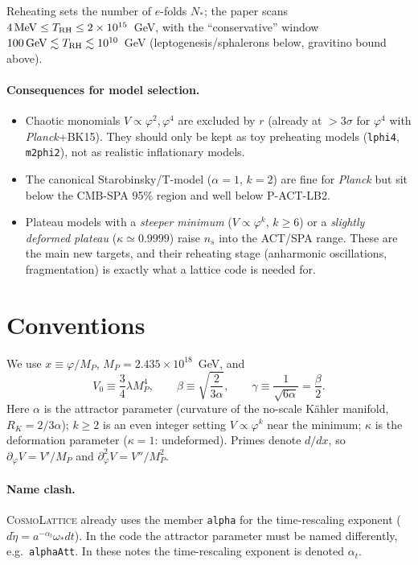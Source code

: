 \documentclass[11pt,a4paper]{article}
\newcommand{\MP}{M_P}
\newcommand{\trh}{T_{\rm RH}}
\newcommand{\aatt}{\alpha}
\newcommand{\at}{\alpha_t}
\begin{document}
Reheating sets the number of $e$-folds $N_*$; the paper scans $4\,{\rm MeV}\le \trh \le 2\times 10^{15}$~GeV, with the ``conservative'' window $100\,{\rm GeV}\lesssim \trh \lesssim 10^{10}$~GeV (leptogenesis/sphalerons below, gravitino bound above).

\paragraph{Consequences for model selection.}
\begin{itemize}
\item Chaotic monomials $V\propto\varphi^2,\varphi^4$ are excluded by $r$ (already at $>3\sigma$ for $\varphi^4$ with \textit{Planck}+BK15). They should only be kept as toy preheating models (\texttt{lphi4}, \texttt{m2phi2}), not as realistic inflationary models.
\item The canonical Starobinsky/T-model ($\aatt=1$, $k=2$) are fine for \textit{Planck} but sit below the CMB-SPA 95\% region and well below P-ACT-LB2.
\item Plateau models with a \emph{steeper minimum} ($V\propto\varphi^k$, $k\ge 6$) or a \emph{slightly deformed plateau} ($\kappa\simeq 0.9999$) raise $n_s$ into the ACT/SPA range. These are the main new targets, and their reheating stage (anharmonic oscillations, fragmentation) is exactly what a lattice code is needed for.
\end{itemize}

\section{Conventions}
\label{sec:conv}

We use $x\equiv\varphi/\MP$, $\MP = 2.435\times 10^{18}$~GeV, and
\begin{equation}
V_0 \equiv \frac34\lambda\MP^4, \qquad
\beta \equiv \sqrt{\frac{2}{3\aatt}}, \qquad
\gamma \equiv \frac{1}{\sqrt{6\aatt}} = \frac{\beta}{2}.
\end{equation}
Here $\aatt$ is the attractor parameter (curvature of the no-scale K\"ahler manifold, $R_K = 2/3\aatt$); $k\ge 2$ is an even integer setting $V\propto\varphi^k$ near the minimum; $\kappa$ is the deformation parameter ($\kappa=1$: undeformed). Primes denote $d/dx$, so $\partial_\varphi V = V'/\MP$ and $\partial^2_\varphi V = V''/\MP^2$.

\paragraph{Name clash.} \textsc{CosmoLattice} already uses the member \texttt{alpha} for the time-rescaling exponent ($d\tilde\eta = a^{-\at}\omega_* dt$). In the code the attractor parameter must be named differently, e.g.\ \texttt{alphaAtt}. In these notes the time-rescaling exponent is denoted $\at$.
\end{document}
